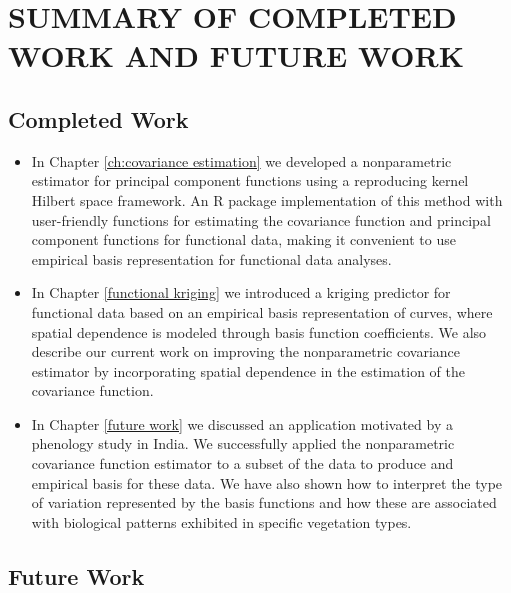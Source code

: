 
\section{SUMMARY OF COMPLETED WORK AND FUTURE WORK}

\subsection{Completed Work}

\begin{itemize}
\item In Chapter \ref{ch:covariance estimation} we developed a nonparametric estimator for principal component functions using a reproducing kernel Hilbert space framework. An R package implementation of this method with user-friendly functions for estimating the covariance function and principal component functions for functional data, making it convenient to use empirical basis representation for functional data analyses. 

\item In Chapter \ref{functional kriging} we introduced a kriging predictor for functional data based on an empirical basis representation of curves, where spatial dependence is modeled through basis function coefficients. We also describe our current work on improving the nonparametric covariance estimator by incorporating spatial dependence in the estimation of the covariance function. 

\item  In Chapter \ref{future work} we discussed an application motivated by a phenology study in India. We successfully applied the nonparametric covariance function estimator to a subset of the data to produce and empirical basis for these data. We have also shown how to interpret the type of variation represented by the basis functions and how these are associated with biological patterns exhibited in specific vegetation types. 

\end{itemize}

\subsection{Future Work}

